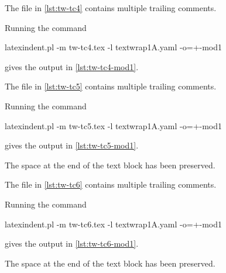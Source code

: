  \begin{example}
  The file in \cref{lst:tw-tc4} contains multiple trailing comments.

  Running the command
  \begin{commandshell}
latexindent.pl -m tw-tc4.tex -l textwrap1A.yaml -o=+-mod1 
\end{commandshell}
  gives the output in \cref{lst:tw-tc4-mod1}.
  \begin{cmhtcbraster}[raster column skip=.1\linewidth]
  \end{cmhtcbraster}
 \end{example}

 \begin{example}
  The file in \cref{lst:tw-tc5} contains multiple trailing comments.

  Running the command
  \begin{commandshell}
latexindent.pl -m tw-tc5.tex -l textwrap1A.yaml -o=+-mod1 
\end{commandshell}
  gives the output in \cref{lst:tw-tc5-mod1}.
  \begin{cmhtcbraster}[raster column skip=.1\linewidth]
  \end{cmhtcbraster}
  The space at the end of the text block has been preserved.
 \end{example}

 \begin{example}
  The file in \cref{lst:tw-tc6} contains multiple trailing comments.

  Running the command
  \begin{commandshell}
latexindent.pl -m tw-tc6.tex -l textwrap1A.yaml -o=+-mod1 
\end{commandshell}
  gives the output in \cref{lst:tw-tc6-mod1}.
  \begin{cmhtcbraster}[raster column skip=.1\linewidth]
  \end{cmhtcbraster}
  The space at the end of the text block has been preserved.
 \end{example}


